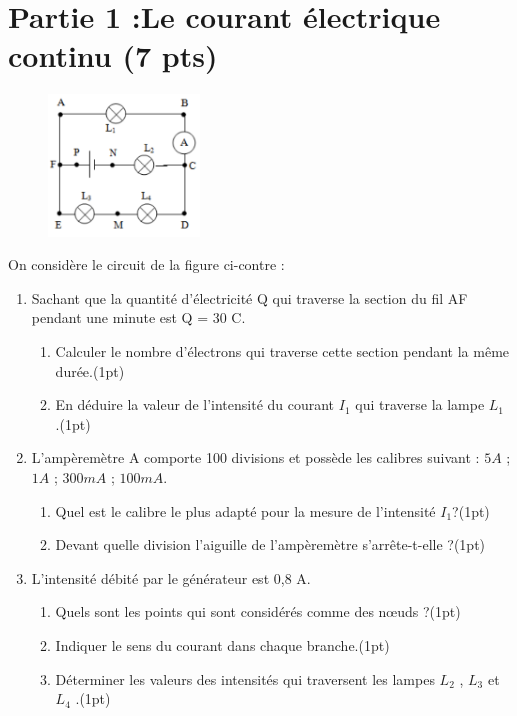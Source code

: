 \documentclass[12pt]{article}
\begin{document}
 \section*{Partie 1 :Le courant électrique continu \dotfill(7 pts)}

\begin{figure}
    \vspace{-1cm}
    \includegraphics[width=0.36\textwidth]{./img/circuit_00.png}
\end{figure}

On considère le circuit de la figure ci-contre : 

\begin{enumerate}
    \item Sachant que la quantité d’électricité Q qui traverse la section du fil AF pendant une minute est Q = 30 C.
        \begin{enumerate}
                \item Calculer le nombre d’électrons qui traverse cette section pendant
                    la même durée.\dotfill(1pt)
                \item En déduire la valeur de l’intensité du courant $I_1$ qui traverse la lampe $L_1$ .\dotfill(1pt)
        \end{enumerate}
    \item L’ampèremètre A comporte 100 divisions et possède les calibres suivant : $5A$ ; $1 A$ ; $300 mA$ ; $100 mA$.
        \begin{enumerate}
            \item Quel est le calibre le plus adapté pour la mesure de l’intensité $I_1$?\dotfill(1pt)
            \item Devant quelle division l’aiguille de l’ampèremètre s’arrête-t-elle ?\dotfill(1pt)

        \end{enumerate}
    \item L’intensité débité par le générateur est 0,8 A.
        \begin{enumerate}
            \item Quels sont les points qui sont considérés comme des nœuds ?\dotfill(1pt)
                \item Indiquer le sens du courant dans chaque branche.\dotfill(1pt)
                \item  Déterminer les valeurs des intensités qui traversent les lampes $L_2$ , $L_3$ et $L_4$ .\dotfill(1pt)
        \end{enumerate}
\end{enumerate}
\end{document}
